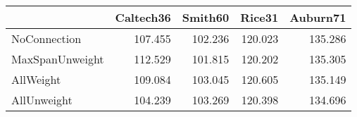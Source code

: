 \begin{tabular}{lrrrr}
\toprule
{} & Caltech36 & Smith60 &  Rice31 & Auburn71 \\
\midrule
NoConnection    &   107.455 & 102.236 & 120.023 &  135.286 \\
MaxSpanUnweight &   112.529 & 101.815 & 120.202 &  135.305 \\
AllWeight       &   109.084 & 103.045 & 120.605 &  135.149 \\
AllUnweight     &   104.239 & 103.269 & 120.398 &  134.696 \\
\bottomrule
\end{tabular}
